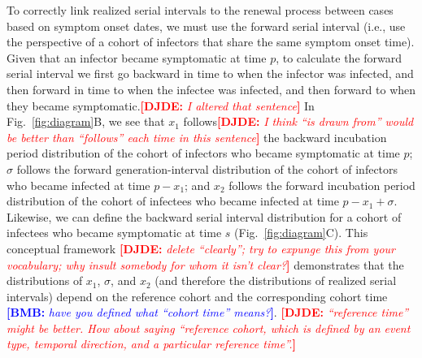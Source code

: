 \documentclass[12pt]{article}
\newcommand{\comment}{\showcomment}
\newcommand{\showcomment}[3]{\textcolor{#1}{\textbf{[#2: }\textsl{#3}\textbf{]}}}
\newcommand{\bmb}[1]{\comment{blue}{BMB}{#1}}
\newcommand{\djde}[1]{\comment{red}{DJDE}{#1}}
\newcommand{\fref}[1]{Fig.~\ref{fig:#1}}
\newcommand{\psymp}{\ensuremath{p}} %
\newcommand{\ssymp}{\ensuremath{s}} %
\newcommand{\gtime}{\sigma} %
\begin{document}
To correctly link realized serial intervals to the renewal process
between cases based on symptom onset dates, we must use the forward
serial interval (i.e., use the perspective of a cohort of infectors
that share the same symptom onset time).  Given that an infector
became symptomatic at time $\psymp$, to calculate the forward serial
interval we first go backward in time to when the infector was
infected, and then forward in time to when the infectee was infected,
and then forward to when they became symptomatic.\djde{I altered that
  sentence} In \fref{diagram}B, we see that $x_1$ follows\djde{I think
  ``is drawn from'' would be better than ``follows'' each time in this
  sentence} the backward incubation period distribution of the cohort
of infectors who became symptomatic at time $\psymp$; $\gtime$ follows
the forward generation-interval distribution of the cohort of
infectors who became infected at time $\psymp - x_1$; and $x_2$
follows the forward incubation period distribution of the cohort of
infectees who became infected at time $\psymp - x_1 + \gtime$.
Likewise, we can define the backward serial interval distribution for
a cohort of infectees who became symptomatic at time $\ssymp$
(\fref{diagram}C).  This conceptual framework \djde{delete
  ``clearly''; try to expunge this from your vocabulary; why insult
  somebody for whom it isn't clear?} demonstrates
that the distributions of $x_1$, $\gtime$, and $x_2$ (and therefore
the distributions of realized serial intervals) depend on the
reference cohort and the corresponding cohort time \bmb{have you
  defined what ``cohort time'' means?}.  \djde{``reference time''
  might be better.  How about saying ``reference cohort, which is
  defined by an event type, temporal direction, and a particular
  reference time''.}
\end{document}
